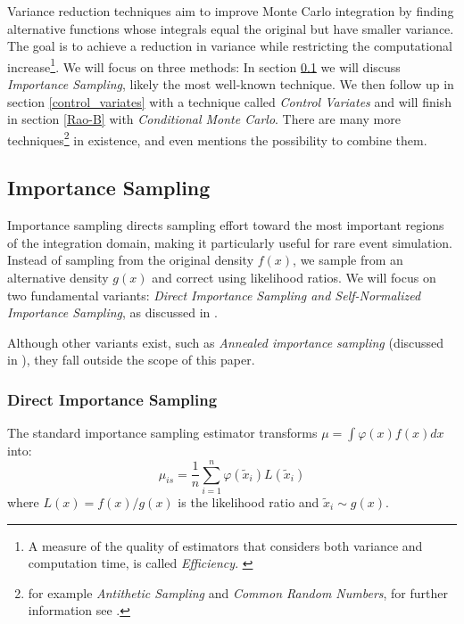 Variance reduction techniques aim to improve Monte Carlo integration by finding alternative functions whose integrals equal the original but have smaller variance. The goal is to achieve a reduction in variance while restricting the computational increase\footnote{A measure of the quality of estimators that considers both variance and computation time, is called \textit{Efficiency}. \cite{lemieux_monte_2009}}. We will focus on three methods: In section \ref{importance_sampling} we will discuss \textit{Importance Sampling}, likely the most well-known technique. We then follow up in section \ref{control_variates} with a technique called \textit{Control Variates} and will finish in section \ref{Rao-B} with \textit{Conditional Monte Carlo}. There are many more techniques\footnote{for example \textit{Antithetic Sampling} and \textit{Common Random Numbers}, for further information see \cite{murphy_probabilistic_2023, lemieux_monte_2009}.} in existence, and \cite{lemieux_monte_2009} even mentions the possibility to combine them.

\subsection{Importance Sampling}
\label{importance_sampling}

Importance sampling directs sampling effort toward the most important regions of the integration domain, making it particularly useful for rare event simulation. Instead of sampling from the original density $f(x)$, we sample from an alternative density $g(x)$ and correct using likelihood ratios. We will focus on two fundamental variants: \textit{Direct Importance Sampling and Self-Normalized Importance Sampling}, as discussed in \cite{lemieux_monte_2009}. 

Although other variants exist, such as \textit{Annealed importance sampling} (discussed in \cite{murphy_probabilistic_2023}), they fall outside the scope of this paper.

\subsubsection{Direct Importance Sampling}

The standard importance sampling estimator transforms $\mu = \int \varphi(x)f(x)dx$ into:
\begin{equation}
\hat{\mu}_{is} = \frac{1}{n}\sum_{i=1}^n \varphi(\tilde{x}_i)L(\tilde{x}_i)
\end{equation}
where $L(x) = f(x)/g(x)$ is the likelihood ratio and $\tilde{x}_i \sim g(x)$. 


